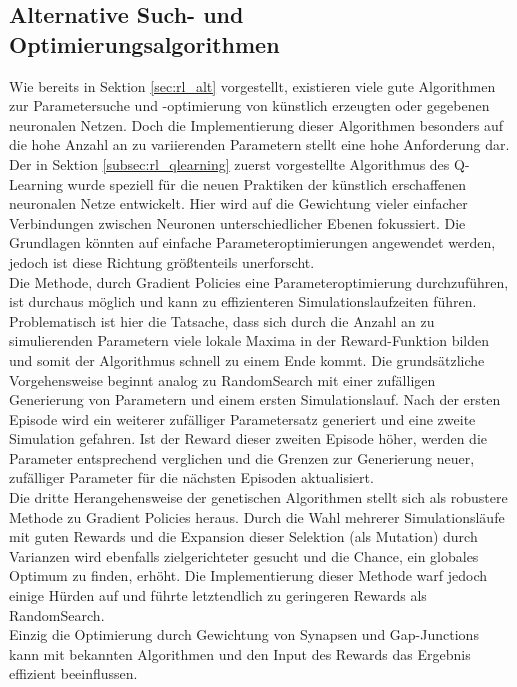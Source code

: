 	\subsection{Alternative Such- und Optimierungsalgorithmen}
		Wie bereits in Sektion \ref{sec:rl_alt} vorgestellt, existieren  viele gute Algorithmen zur Parametersuche und -optimierung von künstlich erzeugten oder gegebenen neuronalen Netzen. Doch die Implementierung dieser Algorithmen besonders auf die hohe Anzahl an zu variierenden Parametern stellt eine hohe Anforderung dar.\\
		Der in Sektion \ref{subsec:rl_qlearning} zuerst vorgestellte Algorithmus des Q-Learning wurde speziell für die neuen Praktiken der künstlich erschaffenen neuronalen Netze entwickelt. Hier wird auf die Gewichtung vieler einfacher Verbindungen zwischen Neuronen unterschiedlicher Ebenen fokussiert. Die Grundlagen könnten auf einfache Parameteroptimierungen angewendet werden, jedoch ist diese Richtung größtenteils unerforscht.\\
		Die Methode, durch Gradient Policies eine Parameteroptimierung durchzuführen, ist durchaus möglich und kann zu effizienteren Simulationslaufzeiten führen. Problematisch ist hier die Tatsache, dass sich durch die Anzahl an zu simulierenden Parametern viele lokale Maxima in der Reward-Funktion bilden und somit der Algorithmus schnell zu einem Ende kommt. Die grundsätzliche Vorgehensweise beginnt analog zu RandomSearch mit einer zufälligen Generierung von Parametern und einem ersten Simulationslauf. Nach der ersten Episode wird ein weiterer zufälliger Parametersatz generiert und eine zweite Simulation gefahren. Ist der Reward dieser zweiten Episode höher, werden die Parameter entsprechend verglichen und die Grenzen zur Generierung neuer, zufälliger Parameter für die nächsten Episoden aktualisiert.\\
		Die dritte Herangehensweise der genetischen Algorithmen stellt sich als robustere Methode zu Gradient Policies heraus. Durch die Wahl mehrerer Simulationsläufe mit guten Rewards und die Expansion dieser Selektion (als Mutation) durch Varianzen wird ebenfalls zielgerichteter gesucht und die Chance, ein globales Optimum zu finden, erhöht. Die Implementierung dieser Methode warf jedoch einige Hürden auf und führte letztendlich zu geringeren Rewards als RandomSearch.\\
		Einzig die Optimierung durch Gewichtung von Synapsen und Gap-Junctions kann mit bekannten Algorithmen und den Input des Rewards das Ergebnis effizient beeinflussen.

